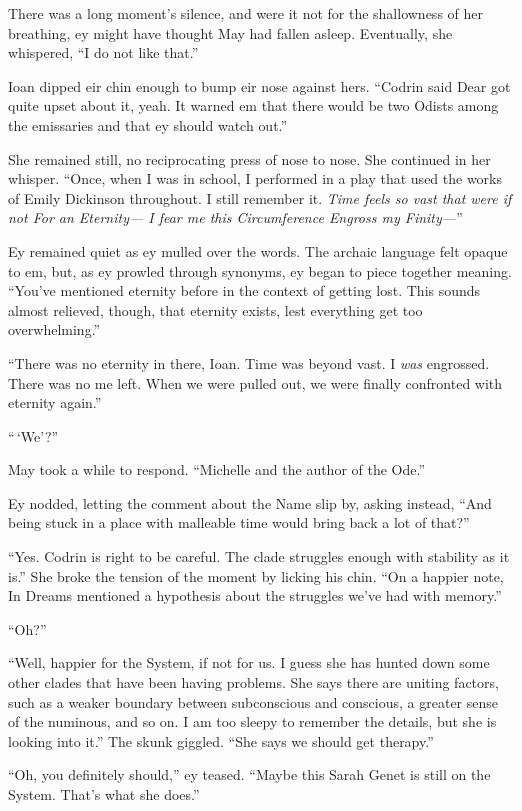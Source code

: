 There was a long moment's silence, and were it not for the shallowness of her breathing, ey might have thought May had fallen asleep. Eventually, she whispered, ``I do not like that.''

Ioan dipped eir chin enough to bump eir nose against hers. ``Codrin said Dear got quite upset about it, yeah. It warned em that there would be two Odists among the emissaries and that ey should watch out.''

She remained still, no reciprocating press of nose to nose. She continued in her whisper. ``Once, when I was in school, I performed in a play that used the works of Emily Dickinson throughout. I still remember it. \emph{Time feels so vast that were if not For an Eternity— I fear me this Circumference Engross my Finity—}''

Ey remained quiet as ey mulled over the words. The archaic language felt opaque to em, but, as ey prowled through synonyms, ey began to piece together meaning. ``You've mentioned eternity before in the context of getting lost. This sounds almost relieved, though, that eternity exists, lest everything get too overwhelming.''

``There was no eternity in there, Ioan. Time was beyond vast. I \emph{was} engrossed. There was no me left. When we were pulled out, we were finally confronted with eternity again.''

``\,`We'?''

May took a while to respond. ``Michelle and the author of the Ode.''

Ey nodded, letting the comment about the Name slip by, asking instead, ``And being stuck in a place with malleable time would bring back a lot of that?''

``Yes. Codrin is right to be careful. The clade struggles enough with stability as it is.'' She broke the tension of the moment by licking his chin. ``On a happier note, In Dreams mentioned a hypothesis about the struggles we've had with memory.''

``Oh?''

``Well, happier for the System, if not for us. I guess she has hunted down some other clades that have been having problems. She says there are uniting factors, such as a weaker boundary between subconscious and conscious, a greater sense of the numinous, and so on. I am too sleepy to remember the details, but she is looking into it.'' The skunk giggled. ``She says we should get therapy.''

``Oh, you definitely should,'' ey teased. ``Maybe this Sarah Genet is still on the System. That's what she does.''

